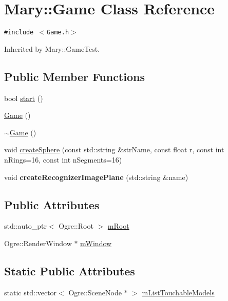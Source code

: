 \hypertarget{class_mary_1_1_game}{
\section{Mary::Game Class Reference}
\label{class_mary_1_1_game}
}
{\tt \#include $<$Game.h$>$}

Inherited by Mary::GameTest.

\subsection*{Public Member Functions}
\begin{CompactItemize}
\item 
bool \hyperlink{class_mary_1_1_game_26ca832057d8e17e801d38549d703fc1}{start} ()
\item 
\hyperlink{class_mary_1_1_game_1dd0363361b2487f464fb3b0690b5d83}{Game} ()
\item 
\hyperlink{class_mary_1_1_game_752202eeaee91035b079e49a3e9a37cf}{$\sim$Game} ()
\item 
void \hyperlink{class_mary_1_1_game_03483c4d1fd0df06c063691978387353}{createSphere} (const std::string \&strName, const float r, const int nRings=16, const int nSegments=16)
\item 
\hypertarget{class_mary_1_1_game_eac1e764de72feac38d851669a347564}{
void \textbf{createRecognizerImagePlane} (std::string \&name)}
\label{class_mary_1_1_game_eac1e764de72feac38d851669a347564}

\end{CompactItemize}
\subsection*{Public Attributes}
\begin{CompactItemize}
\item 
std::auto\_\-ptr$<$ Ogre::Root $>$ \hyperlink{class_mary_1_1_game_eeca741315847788960bda451311d1fb}{mRoot}
\item 
Ogre::RenderWindow $\ast$ \hyperlink{class_mary_1_1_game_5ac0225c8554738b304d2f855d9e0922}{mWindow}
\end{CompactItemize}
\subsection*{Static Public Attributes}
\begin{CompactItemize}
\item 
static std::vector$<$ Ogre::SceneNode $\ast$ $>$ \hyperlink{class_mary_1_1_game_4a50e08c727d246290892e1c28d237e1}{mListTouchableModels}
\end{CompactItemize}

